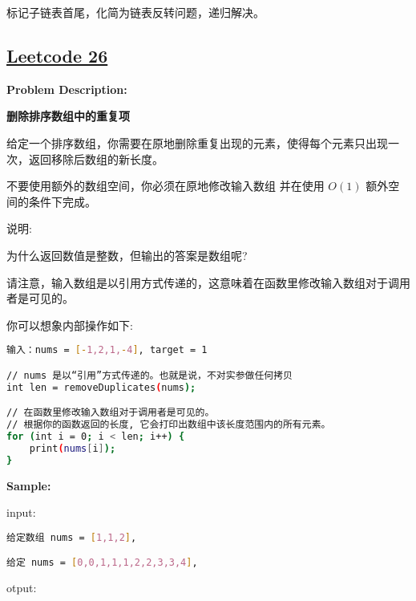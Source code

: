 标记子链表首尾，化简为链表反转问题，递归解决。\par



\subsection{\href{https://leetcode-cn.com/}{Leetcode 26}}\label{app:problemlist:leetcode:26}

\textbf{Problem Description:}\par

\textbf{删除排序数组中的重复项}\par

给定一个排序数组，你需要在原地删除重复出现的元素，使得每个元素只出现一次，返回移除后数组的新长度。\par

不要使用额外的数组空间，你必须在原地修改输入数组 并在使用 $ O(1) $ 额外空间的条件下完成。\par

说明:\par

为什么返回数值是整数，但输出的答案是数组呢?\par

请注意，输入数组是以引用方式传递的，这意味着在函数里修改输入数组对于调用者是可见的。\par

你可以想象内部操作如下:\par

\begin{lstlisting}[language=bash]
输入：nums = [-1,2,1,-4], target = 1

// nums 是以“引用”方式传递的。也就是说，不对实参做任何拷贝
int len = removeDuplicates(nums);

// 在函数里修改输入数组对于调用者是可见的。
// 根据你的函数返回的长度, 它会打印出数组中该长度范围内的所有元素。
for (int i = 0; i < len; i++) {
    print(nums[i]);
}
\end{lstlisting}


\textbf{Sample:}\par

input:\par

\begin{lstlisting}[language=bash]
给定数组 nums = [1,1,2], 

给定 nums = [0,0,1,1,1,2,2,3,3,4],
\end{lstlisting}

otput:\par


